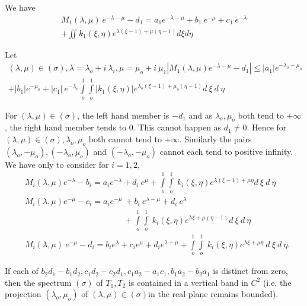 We have
\begin{multline*}
  M_1 (\lambda, \mu) ~ e^{-\lambda - \mu} - d_1 = a_1 e^{-\lambda - \mu}
  + b_1 ~ e^{-\mu} + c_1 ~ e^{- \lambda}\\ 
  + \iint k_1 (\xi,\eta)
  e^{\lambda(\xi - 1) + \mu(\eta - 1)} d \xi d \eta 
\end{multline*}

Let\pageoriginale 
\begin{multline*}
  (\lambda,\mu) \in (\sigma), \lambda = \lambda_o + i ~ \lambda_i,
  \mu = \mu_o + i ~ \mu_1
  | M_1 (\lambda,\mu)e^{-\lambda - \mu} - d_1 |
  \le | a_1 | e^{- \lambda_o - \mu_o}\\ 
  + | b_1 | e^{-\mu_o} + | c_1 |  ~
  e^{-\lambda_o}\int\limits_o^1 \int\limits_o^1 | k_1 (\xi,\eta) |
  e^{\lambda_o(\xi - 1) + \mu_o (\eta - 1)} d ~ \xi ~ d ~ \eta 
\end{multline*}

For $(\lambda,\mu) \in (\sigma)$, the left hand member is $-d_1$ and
as $\lambda_o,\mu_o$ both tend to $+ \infty$, the right hand member
tends to $0$. This cannot happen as $d_1 \neq 0$. Hence for $(\lambda,
\mu) \in (\sigma), \lambda_o, \mu_o$ both cannot tend to $+
\infty$. Similarly the pairs $(\lambda_o, - \mu_o), (-\lambda_o,
\mu_o)$ and $(-\lambda_o, - \mu_o)$ cannot each tend to positive
infinity. We have only to consider for $i = 1,2$,  
\begin{align*}
  & M_i (\lambda,\mu) e^{-\lambda} - b_i = a_i  e^{-\lambda} +
  d_i ~ e^{\mu} + \int\limits_o^1 \int\limits_o^1 ~ k_i (\xi,\eta)
  e^{\lambda(\xi - 1) + \mu\eta} d ~ \xi ~ d ~ \eta\\ 
  & M_i (\lambda, \mu) e^{- \mu} - c_i = a_i e^{-\mu}~ + b_i ~
  e^{\lambda - \mu} + d_i ~ e^\lambda \\
  & \hspace{5cm}+ \int\limits_o^1
  \int\limits_o^1 ~k_i (\xi,\eta) e^{\lambda \xi + \mu (\eta - 1)} d
  ~\xi ~d ~ \eta\\ 
  & M_i (\lambda, \mu) ~ e^{- \mu} - d_i = b_i e^\lambda + c_i e^\mu +
  d_i e^{\lambda+\mu} + \int\limits_o^1 \int\limits^1_o ~k_i (\xi,\eta)
  e^{\lambda \xi + \mu \eta} ~ d ~ \xi ~ d ~ \eta. 
\end{align*}

\setcounter{proposition}{0}
\begin{proposition}\label{part2:chap3:sec8:prop1}%
  If each of $b_2 d_1 - b_1 d_2, c_1 d_2- c_2 d_1,  c_1 a_2 - a_1 c_1,
  b_1 a_2-b_2 a_1$ is distinct from zero, then the spectrum $(\sigma)$
  of $T_1, T_2$  is contained in a vertical band in $C^2$ (i.e. the
  projection $(\lambda_o, \mu_o)$ of $(\lambda,\mu) \in (\sigma)$\pageoriginale in
  the real plane remains bounded). 
\end{proposition}

